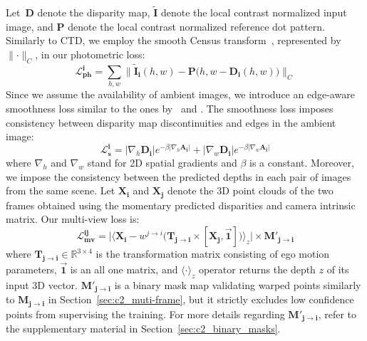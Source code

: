 Let~$\boldsymbol{D}$ denote the disparity map, $\boldsymbol{\tilde{I}}$ denote the local contrast normalized input image, and $\boldsymbol{P}$ denote the local contrast normalized reference dot pattern. Similarly to CTD, we employ the smooth Census transform~\citep{hafner2013census}, represented by $\parallel \cdot \parallel_{C}$, in our photometric loss:
\begin{equation}\label{eqn:photometric}
    \boldsymbol{\mathcal{L}^{i}_{ph}}=\sum_{h,w} \parallel \boldsymbol{\tilde{I}_i}(h,w) - \boldsymbol{P}\big(h,w - \boldsymbol{D_{i}}(h,w)\big) \parallel_{C}
\end{equation}
Since we assume the availability of ambient images, we introduce an edge-aware smoothness loss similar to the ones by~\cite{godard2017unsupervised} and \cite{godard2019digging}. The smoothness loss imposes consistency between disparity map discontinuities and edges in the ambient image:
\begin{equation}
    \boldsymbol{\mathcal{L}^{i}_{s}}= |\nabla_{h} \boldsymbol{D_{i}}|e^{-\beta|\nabla_{h} \boldsymbol{A_{i}}|}
    +
    |\nabla_{w} \boldsymbol{D_{i}}|e^{-\beta|\nabla_{w} \boldsymbol{A_{i}}|}
\end{equation}
where $\nabla_{h}$ and $\nabla_{w}$ stand for 2D spatial gradients and $\beta$ is a constant. Moreover, we impose the consistency between the predicted depths in each pair of images from the same scene. Let $\boldsymbol{X_{i}}$ and $\boldsymbol{X_{j}}$ denote the 3D point clouds of the two frames obtained using the momentary predicted disparities and camera intrinsic matrix. Our multi-view loss is:
\begin{equation}
    \boldsymbol{\mathcal{L}^{ij}_{mv}}=
    \bigg|
    \Big \langle \boldsymbol{X_{i}} -
    w^{j \rightarrow i}
    \big( \boldsymbol{T_{j \rightarrow i}} \times [\boldsymbol{X_{j}},\vec{\mathbf{1}}] \big) \Big \rangle_z
    \bigg| \times \boldsymbol{M'_{j \rightarrow i}}
\end{equation}
where $\boldsymbol{T_{j \rightarrow i}} \in \mathbb{R}^{3 \times 4}$ is the transformation matrix consisting of ego motion parameters, $\vec{\mathbf{1}}$ is an all one matrix, and $\langle\cdot\rangle_z$ operator returns the depth $z$ of its input 3D vector. $\boldsymbol{M'_{j \rightarrow i}}$ is a binary mask map validating warped points similarly to $\boldsymbol{M_{j \rightarrow i}}$ in Section~\ref{sec:c2_muti-frame}, but it strictly excludes low confidence points from supervising the training. For more details regarding $\boldsymbol{M'_{j \rightarrow i}}$, refer to the supplementary material in Section~\ref{sec:c2_binary_masks}.

